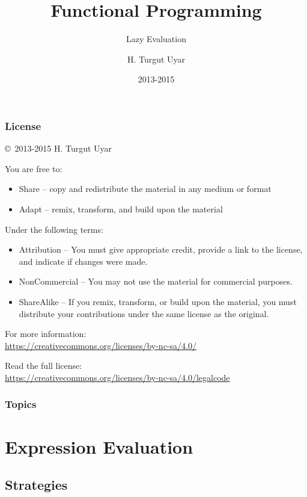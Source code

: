\documentclass[dvipsnames]{beamer}
\title{Functional Programming}
\subtitle{Lazy Evaluation}
\author{H. Turgut Uyar}
\date{2013-2015}
\theoremstyle{plain}
\begin{document}
\begin{frame}
  \titlepage
\end{frame}

\begin{frame}
  \frametitle{License}

  \hfill
  \copyright~2013-2015 H. Turgut Uyar

  \vfill
  \begin{footnotesize}
    You are free to:
    \begin{itemize}
      \itemsep0em
      \item Share -- copy and redistribute the material in any medium or format
      \item Adapt -- remix, transform, and build upon the material
    \end{itemize}

    Under the following terms:
    \begin{itemize}
      \itemsep0em
      \item Attribution -- You must give appropriate credit, provide a link to
        the license, and indicate if changes were made.

      \item NonCommercial -- You may not use the material for commercial
        purposes.

      \item ShareAlike -- If you remix, transform, or build upon the material,
        you must distribute your contributions under the same license as the
        original.
    \end{itemize}

    For more information:\\
    \url{https://creativecommons.org/licenses/by-nc-sa/4.0/}

    \smallskip
    Read the full license:\\
    \url{https://creativecommons.org/licenses/by-nc-sa/4.0/legalcode}
  \end{footnotesize}
\end{frame}

\begin{frame}
  \frametitle{Topics}
  \tableofcontents
\end{frame}

\section{Expression Evaluation}

\subsection{Strategies}
\end{document}
